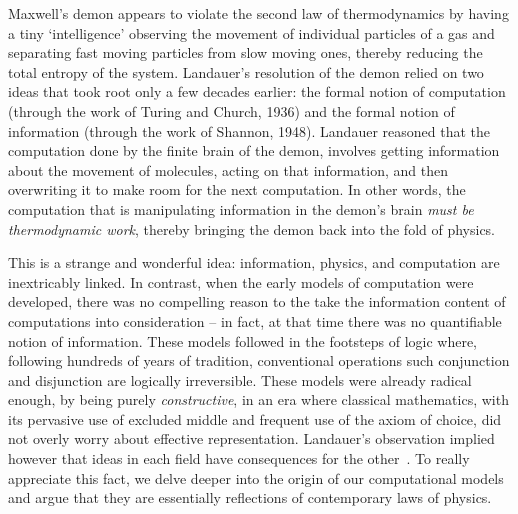 \documentclass{article}
\begin{document}
Maxwell's demon appears to violate the second law of thermodynamics by
having a tiny `intelligence' observing the movement of individual
particles of a gas and separating fast moving particles from slow
moving ones, thereby reducing the total entropy of the
system. Landauer's resolution of the demon relied on two ideas that
took root only a few decades earlier: the formal notion of computation
(through the work of Turing and Church, 1936) and the formal notion of
information (through the work of Shannon, 1948). Landauer reasoned
that the computation done by the finite brain of the demon, involves
getting information about the movement of molecules, acting on that
information, and then overwriting it to make room for the next
computation.  In other words, the computation that is manipulating
information in the demon's brain \textit{must be thermodynamic work},
thereby bringing the demon back into the fold of physics.

This is a strange and wonderful idea: information, physics, and
computation are inextricably linked. In contrast, when the early
models of computation were developed, there was no compelling reason
to the take the information content of computations into consideration
-- in fact, at that time there was no quantifiable notion of
information. These models followed in the footsteps of logic where,
following hundreds of years of tradition, conventional operations such
conjunction and disjunction are logically irreversible. These models
were already radical enough, by being purely \emph{constructive}, in
an era where classical mathematics, with its pervasive use of excluded
middle and frequent use of the axiom of choice, did not overly worry
about effective representation. Landauer's observation implied however
that ideas in each field have consequences for the
other~\cite{bennett:1973:lrc,bennett1985fundamental,bennett2010notes,bennett2003notes,baker:1992:nft,baez2011physics,dblp:conf/csfw/malacarias12}. To
really appreciate this fact, we delve deeper into the origin of our
computational models and argue that they are essentially reflections
of contemporary laws of physics. 

\end{document}
